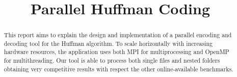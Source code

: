 \documentclass[conference]{IEEEtran}
\begin{document}
\title{Parallel Huffman Coding}

\author{
    \and
}

\maketitle

\thispagestyle{plain}
\pagestyle{plain}

\begin{abstract}
    This report aims to explain the design and implementation of a parallel encoding and decoding tool for the Huffman algorithm.
    To scale horizontally with increasing hardware resources, the application uses both MPI for multiprocessing and OpenMP for multithreading.
    Our tool is able to process both single files and nested folders obtaining very competitive results with respect the other online-available benchmarks.
\end{abstract}






{}



\end{document}
